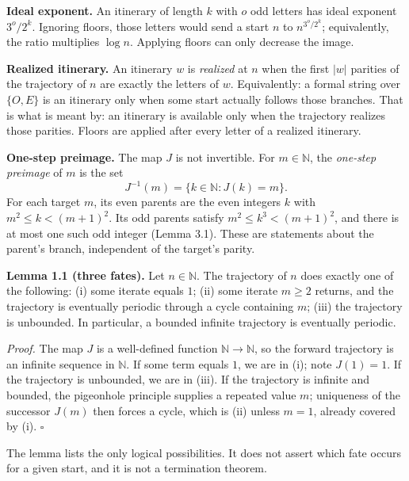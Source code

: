 \documentclass[12pt]{article}
\begin{document}
\textbf{Ideal exponent.} An itinerary of length \(k\) with \(o\) odd
letters has ideal exponent \(3^o/2^k\). Ignoring floors, those letters
would send a start \(n\) to \(n^{3^o/2^k}\); equivalently, the ratio
multiplies \(\log n\). Applying floors can only decrease the image.

\textbf{Realized itinerary.} An itinerary \(w\) is \emph{realized} at
\(n\) when the first \(\lvert w\rvert\) parities of the trajectory of
\(n\) are exactly the letters of \(w\). Equivalently: a formal string
over \(\{O,E\}\) is an itinerary only when some start actually follows
those branches. That is what is meant by: an itinerary is available only
when the trajectory realizes those parities. Floors are applied after
every letter of a realized itinerary.

\textbf{One-step preimage.} The map \(J\) is not invertible. For
\(m\in\mathbb N\), the \emph{one-step preimage} of \(m\) is the set \[
J^{-1}(m)=\{k\in\mathbb N:J(k)=m\}.
\] For each target \(m\), its even parents are the even integers \(k\)
with \(m^2\le k<(m+1)^2\). Its odd parents satisfy
\(m^2\le k^3<(m+1)^2\), and there is at most one such odd integer (Lemma
3.1). These are statements about the parent's branch, independent of the
target's parity.

\textbf{Lemma 1.1 (three fates).} Let \(n\in\mathbb N\). The trajectory
of \(n\) does exactly one of the following: (i) some iterate equals
\(1\); (ii) some iterate \(m\ge 2\) returns, and the trajectory is
eventually periodic through a cycle containing \(m\); (iii) the
trajectory is unbounded. In particular, a bounded infinite trajectory is
eventually periodic.

\emph{Proof.} The map \(J\) is a well-defined function
\(\mathbb N\to\mathbb N\), so the forward trajectory is an infinite
sequence in \(\mathbb N\). If some term equals \(1\), we are in (i);
note \(J(1)=1\). If the trajectory is unbounded, we are in (iii). If the
trajectory is infinite and bounded, the pigeonhole principle supplies a
repeated value \(m\); uniqueness of the successor \(J(m)\) then forces a
cycle, which is (ii) unless \(m=1\), already covered by (i). \(\square\)

The lemma lists the only logical possibilities. It does not assert which
fate occurs for a given start, and it is not a termination theorem.

\begingroup\small
\end{document}
